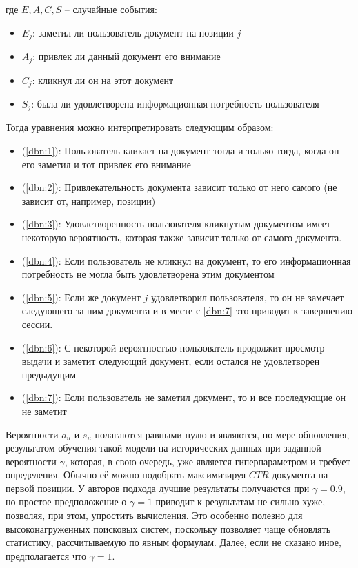 \documentclass[diploma]{nanolab2015}
\begin{document}
где $E, A, C, S$ -- случайные события:
\begin{itemize}
    \item $E_j$: заметил ли пользователь документ на позиции $j$
    \item $A_j$: привлек ли данный документ его внимание
    \item $C_j$: кликнул ли он на этот документ
    \item $S_j$: была ли удовлетворена информационная потребность пользователя
\end{itemize}
Тогда уравнения можно интерпретировать следующим образом:
\begin{itemize}
    \item (\ref{dbn:1}): Пользователь кликает на документ тогда и только тогда, когда он его заметил и тот привлек его внимание
    \item (\ref{dbn:2}): Привлекательность документа зависит только от него самого (не зависит от, например, позиции)
    \item (\ref{dbn:3}): Удовлетворенность пользователя кликнутым документом имеет некоторую вероятность, которая также зависит только от самого документа.
    \item (\ref{dbn:4}): Если пользователь не кликнул на документ, то его информационная потребность не могла быть удовлетворена этим документом
    \item (\ref{dbn:5}): Если же документ $j$ удовлетворил пользователя, то он не замечает следующего за ним документа и в месте с \ref{dbn:7} это приводит к завершению сессии.
    \item (\ref{dbn:6}): С некоторой вероятностью пользователь продолжит просмотр выдачи и заметит следующий документ, если остался не удовлетворен предыдущим
    \item (\ref{dbn:7}): Если пользователь не заметил документ, то и все последующие он не заметит
\end{itemize}

Вероятности $a_u$ и $s_u$ полагаются равными нулю и являются, по мере обновления, результатом обучения такой модели на исторических данных при заданной вероятности $\gamma$, которая, в свою очередь, уже является гиперпараметром и требует определения. Обычно её можно подобрать максимизируя $CTR$ документа на первой позиции. У авторов подхода лучшие результаты получаются при $\gamma = 0.9$, но простое предположение о $\gamma = 1$ приводит к результатам не сильно хуже, позволяя, при этом, упростить вычисления. Это особенно полезно для высоконагруженных поисковых систем, поскольку позволяет чаще обновлять статистику, рассчитываемую по явным формулам. Далее, если не сказано иное, предполагается что $\gamma = 1$. 
\end{document}
